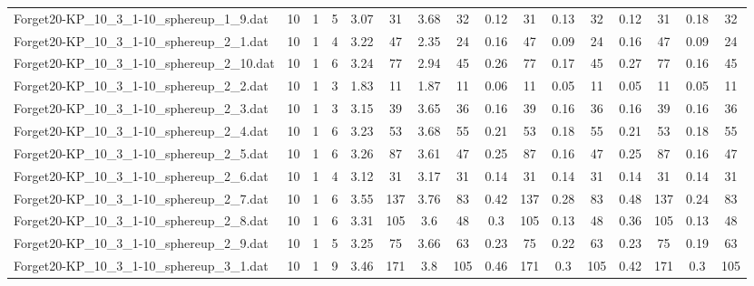 \begin{sidewaystable}[!ht]
{\begin{tabular}{lccccccccccccccc}
Forget20-KP\_10\_3\_1-10\_sphereup\_1\_9.dat & 10 & 1 & 5 & 3.07 & 31 & 3.68 & 32 &  \textcolor{blue2}{0.12} & 31 & 0.13 & 32 &  \textcolor{blue2}{0.12} & 31 & 0.18 & 32 \\
Forget20-KP\_10\_3\_1-10\_sphereup\_2\_1.dat & 10 & 1 & 4 & 3.22 & 47 & 2.35 & 24 & 0.16 & 47 &  \textcolor{blue2}{0.09} & 24 & 0.16 & 47 &  \textcolor{blue2}{0.09} & 24 \\
Forget20-KP\_10\_3\_1-10\_sphereup\_2\_10.dat & 10 & 1 & 6 & 3.24 & 77 & 2.94 & 45 & 0.26 & 77 & 0.17 & 45 & 0.27 & 77 &  \textcolor{blue2}{0.16} & 45 \\
Forget20-KP\_10\_3\_1-10\_sphereup\_2\_2.dat & 10 & 1 & 3 & 1.83 & 11 & 1.87 & 11 & 0.06 & 11 &  \textcolor{blue2}{0.05} & 11 &  \textcolor{blue2}{0.05} & 11 &  \textcolor{blue2}{0.05} & 11 \\
Forget20-KP\_10\_3\_1-10\_sphereup\_2\_3.dat & 10 & 1 & 3 & 3.15 & 39 & 3.65 & 36 &  \textcolor{blue2}{0.16} & 39 &  \textcolor{blue2}{0.16} & 36 &  \textcolor{blue2}{0.16} & 39 &  \textcolor{blue2}{0.16} & 36 \\
Forget20-KP\_10\_3\_1-10\_sphereup\_2\_4.dat & 10 & 1 & 6 & 3.23 & 53 & 3.68 & 55 & 0.21 & 53 &  \textcolor{blue2}{0.18} & 55 & 0.21 & 53 &  \textcolor{blue2}{0.18} & 55 \\
Forget20-KP\_10\_3\_1-10\_sphereup\_2\_5.dat & 10 & 1 & 6 & 3.26 & 87 & 3.61 & 47 & 0.25 & 87 &  \textcolor{blue2}{0.16} & 47 & 0.25 & 87 &  \textcolor{blue2}{0.16} & 47 \\
Forget20-KP\_10\_3\_1-10\_sphereup\_2\_6.dat & 10 & 1 & 4 & 3.12 & 31 & 3.17 & 31 &  \textcolor{blue2}{0.14} & 31 &  \textcolor{blue2}{0.14} & 31 &  \textcolor{blue2}{0.14} & 31 &  \textcolor{blue2}{0.14} & 31 \\
Forget20-KP\_10\_3\_1-10\_sphereup\_2\_7.dat & 10 & 1 & 6 & 3.55 & 137 & 3.76 & 83 & 0.42 & 137 & 0.28 & 83 & 0.48 & 137 &  \textcolor{blue2}{0.24} & 83 \\
Forget20-KP\_10\_3\_1-10\_sphereup\_2\_8.dat & 10 & 1 & 6 & 3.31 & 105 & 3.6 & 48 & 0.3 & 105 &  \textcolor{blue2}{0.13} & 48 & 0.36 & 105 &  \textcolor{blue2}{0.13} & 48 \\
Forget20-KP\_10\_3\_1-10\_sphereup\_2\_9.dat & 10 & 1 & 5 & 3.25 & 75 & 3.66 & 63 & 0.23 & 75 & 0.22 & 63 & 0.23 & 75 &  \textcolor{blue2}{0.19} & 63 \\
Forget20-KP\_10\_3\_1-10\_sphereup\_3\_1.dat & 10 & 1 & 9 & 3.46 & 171 & 3.8 & 105 & 0.46 & 171 &  \textcolor{blue2}{0.3} & 105 & 0.42 & 171 &  \textcolor{blue2}{0.3} & 105 \\

\end{tabular}}
\end{sidewaystable}
